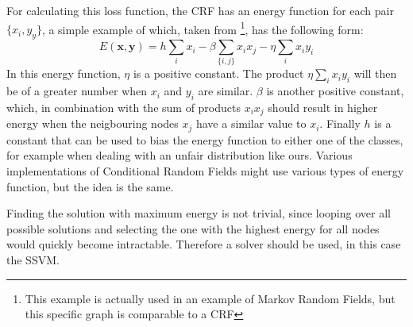 For calculating this loss function, the CRF has an energy function for each pair
$\{x_i, y_y\}$, a simple
example of which, taken from \cite{bishop2006pattern}\footnote{This example is actually
used in an example of Markov Random Fields, but this specific graph is
comparable to a CRF},  has the following form: 
\begin{equation}
E(\mathbf{x}, \mathbf{y}) = h\sum_i x_i - \beta \sum_{\{i, j\}} x_i x_j
- \eta \sum_i x_i y_i
\end{equation}
In this energy function, $\eta$ is a positive constant. The product $\eta \sum_i
x_i y_i$ will then be of a greater number when $x_i$ and $y_i$ are similar.
$\beta$ is another positive constant, which, in combination with the sum of
products $x_i x_j$ should result in higher energy when the neigbouring nodes
$x_j$ have a similar value to $x_i$. Finally $h$ is a constant that can be used
to bias the energy function to either one of the classes, for example when
dealing with an unfair distribution like ours. Various implementations of
Conditional Random Fields might use various types of energy function, but the
idea is the same.

Finding the solution with maximum energy is not trivial, since 
looping over all possible solutions and selecting the one with the highest energy
for all nodes would quickly become intractable. Therefore a solver should be
used, in this case the SSVM.


